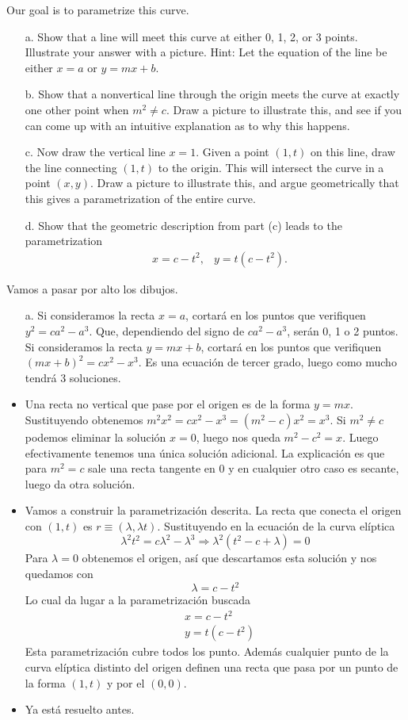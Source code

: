 \documentclass[twoside]{article}
\begin{document}
Our goal is to parametrize this curve.
\begin{itemize}
\item[a.] Show that a line will meet this curve at either 0, 1, 2, or 3 points. Illustrate your answer
with a picture. Hint: Let the equation of the line be either $x = a$ or $y = mx + b$.
\item[b.] Show that a nonvertical line through the origin meets the curve at exactly one other
point when $m^2 \neq c$. Draw a picture to illustrate this, and see if you can come up with
an intuitive explanation as to why this happens.
\item[c.] Now draw the vertical line $x = 1$. Given a point $(1, t)$ on this line, draw the line
connecting $(1, t)$ to the origin. This will intersect the curve in a point $(x, y)$. Draw a
picture to illustrate this, and argue geometrically that this gives a parametrization of
the entire curve.
\item[d.] Show that the geometric description from part (c) leads to the parametrization
\begin{align*}
&x = c − t^2,
&y = t(c − t^2).
\end{align*}
\end{itemize}
\begin{solucion}
Vamos a pasar por alto los dibujos. 
\begin{itemize}
\item[a.] Si consideramos la recta $x=a$, cortará en los puntos que verifiquen $y^2=ca^2-a^3$. Que, dependiendo del signo de $ca^2-a^3$, serán 0, 1 o 2 puntos.  Si consideramos la recta $y=mx+b$, cortará en los puntos que verifiquen $(mx+b)^2=cx^2-x^3$. Es una ecuación de tercer grado, luego como mucho tendrá 3 soluciones.
\item Una recta no vertical que pase por el origen es de la forma $y=mx$. Sustituyendo obtenemos $m^2x^2=cx^2-x^3=(m^2-c)x^2=x^3$. Si $m^2\neq c$ podemos eliminar la solución $x=0$, luego nos queda $m^2-c^2=x$. Luego efectivamente tenemos una única solución adicional. La explicación es que para $m^2=c$ sale una recta tangente en 0 y en cualquier otro caso es secante, luego da otra solución. 
\item Vamos a construir la parametrización descrita. La recta que conecta el origen con $(1,t)$ es $r\equiv (\lambda, \lambda t)$. Sustituyendo en la ecuación de la curva elíptica
\[
\lambda^2t^2=c\lambda^2-\lambda^3\Rightarrow \lambda^2(t^2-c+\lambda)=0
\]
Para $\lambda=0$ obtenemos el origen, así que descartamos esta solución y nos quedamos con
\[
\lambda=c-t^2
\]
Lo cual da lugar a la parametrización buscada
\begin{align*}
&x= c-t^2\\
&y=t(c-t^2)
\end{align*}
Esta parametrización cubre todos los punto. Además cualquier punto de la curva elíptica distinto del origen definen una recta que pasa por un punto de la forma $(1,t)$ y por el $(0,0)$. 
\item Ya está resuelto antes.
\end{itemize}
\end{solucion}
\end{document}
